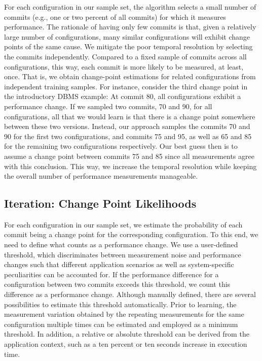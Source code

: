 \documentclass[sigconf]{acmart}
\begin{document}
	For each configuration in our sample set, the algorithm selects a small number of commits (e.g., one or two percent of all commits) for which it measures performance. 
	The rationale of having only few commits is that, given a relatively large number of configurations, many similar configurations will exhibit change points of the same cause. 
	We mitigate the poor temporal resolution by selecting the commits independently. 
	Compared to a fixed sample of commits across all configurations, this way, each commit is more likely to be measured, at least, once. That is, we obtain change-point estimations for related configurations from independent training samples. 
	For instance, consider the third change point in the introductory DBMS example: 
	At commit 80, all configurations exhibit a performance change. If we sampled two commits, 70 and 90, for all configurations, all that we would learn is that there is a change point somewhere between these two versions. 
	Instead, our approach samples the commits 70 and 90 for the first two configurations, and commits 75 and 95, as well as 65 and 85 for the remaining two configurations respectively. 
	Our best guess then is to assume a change point between commits 75 and 85 since all measurements agree with this conclusion. 
	This way, we increase the temporal resolution while keeping the overall number of performance measurements manageable.
	
	\subsection{Iteration: Change Point Likelihoods}\label{sec:changepointlikelihood}
	For each configuration in our sample set, we estimate the probability of each commit being a change point for the corresponding configuration.
	To this end, we need to define what counts as a performance change. We use a user-defined threshold, which discriminates between measurement noise and performance changes such that different application scenarios as well as system-specific peculiarities can be accounted for.
	If the performance difference for a configuration between two commits exceeds this threshold, we count this difference  as a performance change.
	Although manually defined, there are several possibilities to estimate this threshold automatically.
	Prior to learning, the measurement variation obtained by the repeating measurements for the same configuration multiple times can be estimated and employed as a minimum threshold.
	In addition, a relative or absolute threshold can be derived from the application context, such as a ten percent or ten seconds increase in execution time.
	
\end{document}
